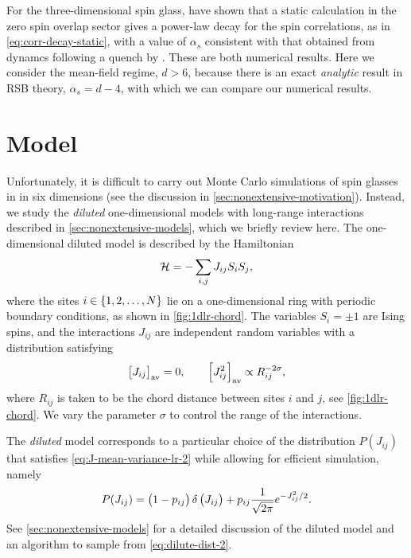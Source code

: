 For the three-dimensional spin glass, \textcite{banos2010nature,banos2010static}
have shown that a static calculation in the zero spin overlap sector
gives a power-law decay for the spin correlations, as in
\cref{eq:corr-decay-static}, with a value of $\alpha_s$ consistent with that
obtained from dynamcs following a quench by \textcite{belletti2009depth}. These
are both numerical results. Here we consider the mean-field regime, $d>6$,
because there is an exact \emph{analytic} result in RSB theory, $\alpha_s=d-4$,
with which we can compare our numerical results.


\section{Model}

Unfortunately, it is difficult to carry out Monte Carlo simulations of spin
glasses in in six dimensions (see the discussion in
\cref{sec:nonextensive-motivation}). Instead, we study the \emph{diluted}
one-dimensional models with long-range interactions described in
\cref{sec:nonextensive-models}, which we briefly review here. The
one-dimensional diluted model is described by the Hamiltonian
\begin{equation}
  \mathcal{H} = -\sum_{i,j} J_{ij} S_i S_j,
\end{equation}
where the sites $i\in\cbr{1,2,\dots,N}$ lie on a one-dimensional ring with
periodic boundary conditions, as shown in \cref{fig:1dlr-chord}. The variables
$S_i = \pm 1$ are Ising spins, and the interactions $J_{ij}$ are independent
random variables with a distribution satisfying
\begin{equation}
  \left[J_{ij}\right]_{\mathrm{av}}=0,\qquad
  \left[J_{ij}^2\right]_{\mathrm{av}} \propto R_{ij}^{-2\sigma},
  \label{eq:J-mean-variance-lr-2}
\end{equation}
where $R_{ij}$ is taken to be the chord distance between sites $i$ and $j$, see
\cref{fig:1dlr-chord}. We vary the parameter $\sigma$ to control the range of
the interactions.

The \emph{diluted} model corresponds to a particular choice of the distribution
$P(J_{ij})$ that satisfies \cref{eq:J-mean-variance-lr-2} while allowing for
efficient simulation, namely
\begin{equation}
  P(J_{ij})
  = \left(1 - p_{ij}\right) \delta \left(J_{ij}\right)
  + p_{ij} \frac{1}{\sqrt{2\pi}} e^{-J_{ij}^2/2}.
  \label{eq:dilute-dist-2}
\end{equation}
See \cref{sec:nonextensive-models} for a detailed discussion of the diluted
model and an algorithm to sample from \cref{eq:dilute-dist-2}.

